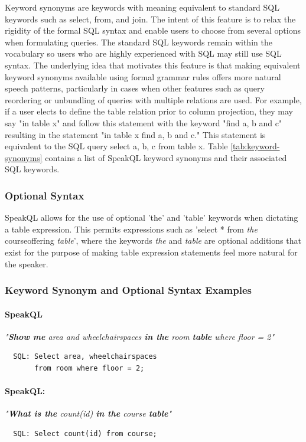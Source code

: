 Keyword synonyms are keywords with meaning equivalent to standard SQL keywords such as select, from, and join. The intent of this feature is to relax the rigidity of the formal SQL syntax and enable users to choose from several options when formulating queries. The standard SQL keywords remain within the vocabulary so users who are highly experienced with SQL may still use SQL syntax. The underlying idea that motivates this feature is that making equivalent keyword synonyms available using formal grammar rules offers more natural speech patterns, particularly in cases when other features such  as query reordering or unbundling of queries with multiple relations are used. For example, if a user elects to define the table relation prior to column projection, they may say "in table x" and follow  this statement with the keyword "find a, b and c" resulting in the statement "in table x find a, b and c." This statement is equivalent to the SQL query select a, b, c from table x. Table \ref{tab:keyword-synonyms} contains a list of SpeakQL keyword synonyms and their associated SQL keywords.

\subsubsection{Optional Syntax}

SpeakQL allows for the use of optional 'the' and 'table' keywords when dictating a table expression. This permits expressions such as 'select * from \emph{the} courseoffering \emph{table}', where the keywords \emph{the} and \emph{table} are optional additions that exist for the purpose of making table expression statements feel more natural for the speaker.

\subsubsection{Keyword Synonym and Optional Syntax Examples}

\paragraph{SpeakQL} \emph{"\textbf{Show me} area and wheelchairspaces \textbf{in the} room \textbf{table} where floor = 2"}
\begin{verbatim}
  SQL: Select area, wheelchairspaces 
       from room where floor = 2;
\end{verbatim}

\paragraph{SpeakQL:} \emph{"\textbf{What is the} count(id) \textbf{in the} course \textbf{table}"}
\begin{verbatim}
  SQL: Select count(id) from course;
\end{verbatim}

